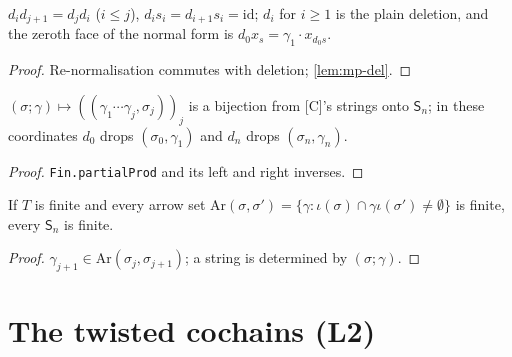 \begin{lemma}\label{lem:mp-face-face}
  \leanok
  $d_id_{j+1}=d_jd_i$ ($i\le j$), $d_is_i=d_{i+1}s_i=\mathrm{id}$; $d_i$ for $i\ge1$ is the plain deletion, and the zeroth face of the
  normal form is $d_0x_s=\gamma_1\cdot x_{d_0s}$.
\end{lemma}
\begin{proof}
  \leanok
  Re-normalisation commutes with deletion; \ref{lem:mp-del}.
\end{proof}

\begin{lemma}[{{[C]}'s coordinates}]\label{lem:mp-set-gamma}
  \leanok
  $(\sigma;\gamma)\mapsto((\gamma_1\cdots\gamma_j,\sigma_j))_j$ is a bijection from [C]'s strings onto $\mathsf S_n$; in these coordinates
  $d_0$ drops $(\sigma_0,\gamma_1)$ and $d_n$ drops $(\sigma_n,\gamma_n)$.
\end{lemma}
\begin{proof}
  \leanok
  \texttt{Fin.partialProd} and its left and right inverses.
\end{proof}

\begin{lemma}[Finiteness]\label{lem:mp-set-finite}
  \leanok
  If $T$ is finite and every arrow set $\mathrm{Ar}(\sigma,\sigma')=\{\gamma:\iota(\sigma)\cap\gamma\iota(\sigma')\ne\emptyset\}$ is finite,
  every $\mathsf S_n$ is finite.
\end{lemma}
\begin{proof}
  \leanok
  $\gamma_{j+1}\in\mathrm{Ar}(\sigma_j,\sigma_{j+1})$; a string is determined by $(\sigma;\gamma)$.
\end{proof}

\section{The twisted cochains (L2)}

